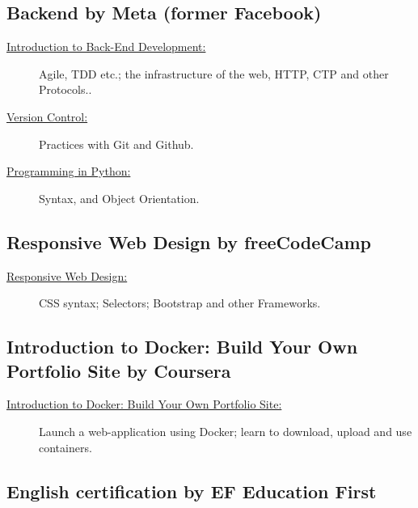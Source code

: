 \documentclass[letterpaper]{../cls/twentysecondcvenglish} %
\begin{document}
\subsection{\textbf{Backend by Meta (former Facebook)}}
\begin{description}
\item[\href{https://buddhilw.github.io/bug-free-fiesta/}{Introduction to Back-End Development:}] Agile, TDD etc.; the infrastructure of the web, HTTP, CTP and other Protocols..
\item[\href{https://buddhilw.github.io/bug-free-fiesta/}{Version Control:}] Practices with Git and Github.
\item[\href{https://buddhilw.github.io/bug-free-fiesta/}{Programming in Python:}] Syntax, and Object Orientation.
\end{description}

\vspace{10mm}
\subsection{\textbf{Responsive Web Design by freeCodeCamp}}

\begin{description}
\item[\href{https://buddhilw.github.io/bug-free-fiesta/}{Responsive Web Design:}] CSS syntax; Selectors; Bootstrap and other Frameworks.
\end{description}

\vspace{10mm}
\subsection{\textbf{Introduction to Docker: Build Your Own Portfolio Site by Coursera}}

\begin{description}
\item[\href{https://buddhilw.github.io/bug-free-fiesta/}{Introduction to Docker: Build Your Own Portfolio Site:}] Launch a web-application using Docker; learn to download, upload and use containers.
\end{description}

\vspace{10mm}
\subsection{\textbf{English certification by EF Education First}}
\end{document}
